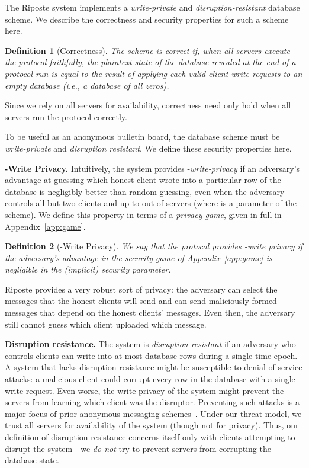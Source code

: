 \documentclass[10pt,twocolumn]{article}
\newtheorem{defn}{Definition}
\newcommand{\nicepara}[1]{\medskip\noindent\textbf{#1.}}
\newcommand{\name}{Riposte\xspace}
\newcommand{\Name}{Riposte\xspace}
\begin{document}
The \name system implements a {\em write-private} and {\em disruption-resistant} 
database scheme. We describe the correctness and security properties for such 
a scheme here.

\begin{defn}[Correctness]
The scheme is {\em correct} if,
when all servers execute the protocol
faithfully, the plaintext state of the database revealed
at the end of a protocol run
is equal to the result of applying
each valid client write requests to an empty database
(i.e., a database of all zeros).
\end{defn}

Since we rely on all servers for availability,
correctness need only hold when all servers 
run the protocol correctly.

\medskip

To be useful as an anonymous bulletin board, the database
scheme must be {\em write-private} and {\em disruption resistant}.
We define these security properties here.

\nicepara{-Write Privacy}
Intuitively, the system provides -{\em write-privacy} if an 
adversary's advantage at guessing which honest
client wrote into a particular row of the database
is negligibly better than random guessing, even 
when the adversary controls all but two clients
and up to  out of  servers 
(where  is a parameter of the scheme).
We define this property in terms of a {\em privacy game},
given in full in Appendix~\ref{app:game}.

\begin{defn}[-Write Privacy]
We say that the protocol provides -{\em write privacy} if the adversary's advantage
in the security game of Appendix~\ref{app:game}
is negligible in the (implicit) security parameter.
\end{defn}

\Name provides a very robust sort of privacy:
the adversary can select the messages that the honest clients will send and
can send maliciously formed messages that depend on the honest clients' messages.
Even then, the adversary still cannot guess which client uploaded which message.



\nicepara{Disruption resistance}
The system is {\em disruption resistant}
if an adversary who controls  clients
can write into at most  database rows during
a single time epoch.
A system that lacks disruption resistance might
be susceptible to denial-of-service attacks:
a malicious client could corrupt every row in the database
with a single write request.
Even worse, the write privacy of the system might prevent
the servers from learning which client was the disruptor.
Preventing such attacks is a major focus of prior
anonymous messaging schemes~\cite{chaum1988dining,goel2003herbivore,golle2004dining,waidner1989dining,wolinsky2012dissent}.
Under our threat model, we trust all servers for
availability of the system (though not for privacy).
Thus, our definition of disruption resistance concerns
itself only with clients attempting to disrupt the
system---we {\em do not} try to prevent servers
from corrupting the database state.
 
\end{document}
